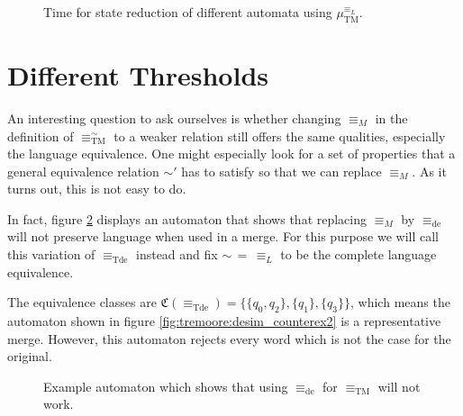 \begin{figure}
\begin{minipage}{0.49\textwidth}
		\caption{Time for state reduction of different automata using $\mu_\text{TM}^{\equiv_L}$.}
		\label{fig:tremoore:empirical_time}
	\end{minipage}
\end{figure}




\section{Different Thresholds}

An interesting question to ask ourselves is whether changing $\equiv_M$ in the definition of $\equiv_\text{TM}^\sim$ to a weaker relation still offers the same qualities, especially the language equivalence. One might especially look for a set of properties that a general equivalence relation $\sim'$ has to satisfy so that we can replace $\equiv_M$. As it turns out, this is not easy to do.

In fact, figure \ref{fig:tremoore:desim_counterex1} displays an automaton that shows that replacing $\equiv_M$ by $\equiv_\text{de}$ will not preserve language when used in a merge. For this purpose we will call this variation of $\equiv_\text{Tde}$ instead and fix $\sim \,=\, \equiv_L$ to be the complete language equivalence.

The equivalence classes are $\mathfrak{C}(\equiv_\text{Tde}) = \{ \{q_0, q_2\}, \{q_1\}, \{q_3\} \}$, which means the automaton shown in figure \ref{fig:tremoore:desim_counterex2} is a representative merge. However, this automaton rejects every word which is not the case for the original.

\begin{figure}
\centering
{}
\caption{Example automaton which shows that using $\equiv_\text{de}$ for $\equiv_\text{TM}$ will not work.}
\label{fig:tremoore:desim_counterex1}
\end{figure}

